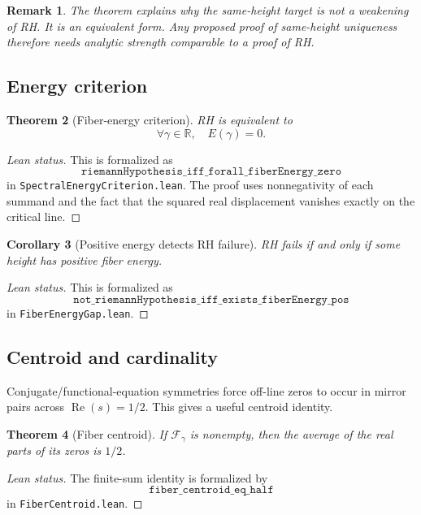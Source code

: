 \documentclass[11pt]{amsart}
\newtheorem{theorem}{Theorem}[section]
\newtheorem{corollary}[theorem]{Corollary}
\newtheorem{remark}[theorem]{Remark}
\newcommand{\R}{\mathbb{R}}
\newcommand{\re}{\operatorname{Re}}
\newcommand{\fiber}{\mathcal{F}}
\newcommand{\lean}[1]{\texttt{#1}}
\begin{document}
\begin{remark}
The theorem explains why the same-height target is not a weakening of RH.  It is
an equivalent form.  Any proposed proof of same-height uniqueness therefore
needs analytic strength comparable to a proof of RH.
\end{remark}

\subsection{Energy criterion}

\begin{theorem}[Fiber-energy criterion]
\label{thm:energy}
RH is equivalent to
\[
  \forall \gamma\in\R,\quad E(\gamma)=0.
\]
\end{theorem}

\begin{proof}[Lean status]
This is formalized as
\[
  \lean{riemannHypothesis\_iff\_forall\_fiberEnergy\_zero}
\]
in \lean{SpectralEnergyCriterion.lean}.  The proof uses nonnegativity of each
summand and the fact that the squared real displacement vanishes exactly on the
critical line.
\end{proof}

\begin{corollary}[Positive energy detects RH failure]
RH fails if and only if some height has positive fiber energy.
\end{corollary}

\begin{proof}[Lean status]
This is formalized as
\[
  \lean{not\_riemannHypothesis\_iff\_exists\_fiberEnergy\_pos}
\]
in \lean{FiberEnergyGap.lean}.
\end{proof}

\subsection{Centroid and cardinality}

Conjugate/functional-equation symmetries force off-line zeros to occur in
mirror pairs across \(\re(s)=1/2\).  This gives a useful centroid identity.

\begin{theorem}[Fiber centroid]
If \(\fiber_\gamma\) is nonempty, then the average of the real parts of its
zeros is \(1/2\).
\end{theorem}

\begin{proof}[Lean status]
The finite-sum identity is formalized by
\[
  \lean{fiber\_centroid\_eq\_half}
\]
in \lean{FiberCentroid.lean}.
\end{proof}
\end{document}
